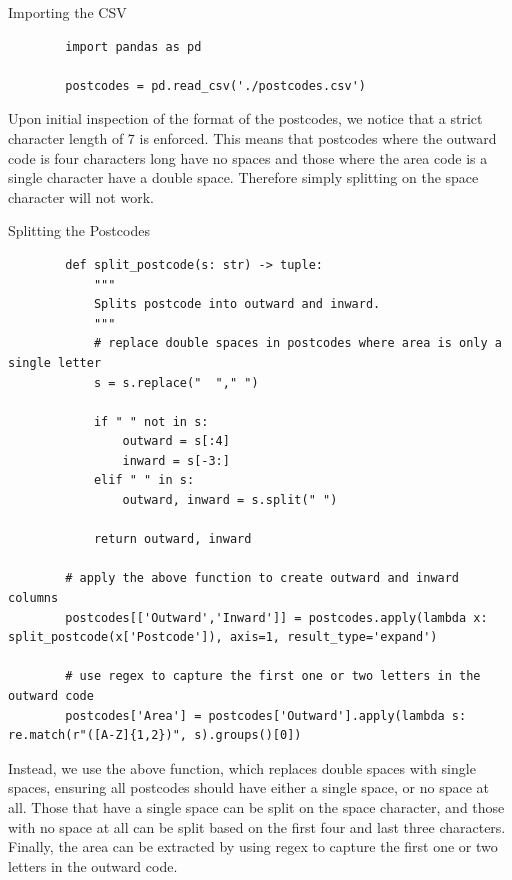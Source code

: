 \documentclass{article}
\begin{document}
\begin{mybox}[colbacktitle=green]{Importing the CSV}
    \begin{verbatim}            
        import pandas as pd 

        postcodes = pd.read_csv('./postcodes.csv')
    \end{verbatim}
\end{mybox}

Upon initial inspection of the format of the postcodes, we notice that a strict character length of 7 is enforced.
This means that postcodes where the outward code is four characters long have no spaces and those where the area code is a single character have a double space.
Therefore simply splitting on the space character will not work.

\begin{mybox}[colbacktitle=green]{Splitting the Postcodes}
    \begin{verbatim}    
        def split_postcode(s: str) -> tuple:
            """
            Splits postcode into outward and inward.
            """
            # replace double spaces in postcodes where area is only a single letter
            s = s.replace("  "," ")

            if " " not in s:
                outward = s[:4]
                inward = s[-3:]
            elif " " in s:
                outward, inward = s.split(" ")

            return outward, inward

        # apply the above function to create outward and inward columns
        postcodes[['Outward','Inward']] = postcodes.apply(lambda x: split_postcode(x['Postcode']), axis=1, result_type='expand')

        # use regex to capture the first one or two letters in the outward code
        postcodes['Area'] = postcodes['Outward'].apply(lambda s: re.match(r"([A-Z]{1,2})", s).groups()[0])
        \end{verbatim}
\end{mybox}

Instead, we use the above function, which replaces double spaces with single spaces, ensuring all postcodes should have either a single space, or no space at all.
Those that have a single space can be split on the space character, and those with no space at all can be split based on the first four and last three characters.
Finally, the area can be extracted by using regex to capture the first one or two letters in the outward code.
\end{document}
